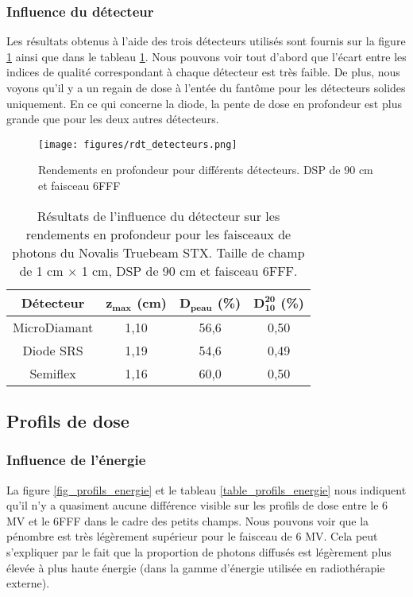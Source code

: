 \documentclass{article}
\begin{document}
\subsubsection{Influence du détecteur}

Les résultats obtenus à l'aide des trois détecteurs utilisés sont fournis sur la figure \ref*{fig_rdt_detecteurs} ainsi que dans le tableau \ref*{table_rdt_detecteurs}. Nous pouvons voir tout d'abord que l'écart entre les indices de qualité correspondant à chaque détecteur est très faible. De plus, nous voyons qu'il y a un regain de dose à l'entée du fantôme pour les détecteurs solides uniquement. En ce qui concerne la diode, la pente de dose en profondeur est plus grande que pour les deux autres détecteurs.

\begin{figure}[h]
  \centering
  \texttt{[image: figures/rdt\_detecteurs.png]}
  \caption{Rendements en profondeur pour différents détecteurs. DSP de 90 cm et faisceau 6FFF}
  \label{fig_rdt_detecteurs}
\end{figure}

\begin{table}[h]
  \centering
  \begin{tabular}{cccc}
    \toprule
    \bfseries Détecteur & $\mathbf{z_{max}}$ \textbf{(cm)} & $\mathbf{D_{peau}}$ \textbf{(\%)} & $\mathbf{D^{20}_{10}}$ \textbf{(\%)} \\
    \toprule
    MicroDiamant & 1,10 & 56,6 & 0,50 \\
    Diode SRS & 1,19 & 54,6 & 0,49 \\
    Semiflex & 1,16 & 60,0 & 0,50 \\
    \bottomrule
  \end{tabular}
  \caption{Résultats de l'influence du détecteur sur les rendements en profondeur pour les faisceaux de photons du Novalis Truebeam STX. Taille de champ de 1 cm $\times$ 1 cm, DSP de 90 cm et faisceau 6FFF.}
  \label{table_rdt_detecteurs}
\end{table}

\newpage
\subsection{Profils de dose}
\subsubsection{Influence de l'énergie}

La figure \ref*{fig_profils_energie} et le tableau \ref*{table_profils_energie} nous indiquent qu'il n'y a quasiment aucune différence visible sur les profils de dose entre le 6 MV et le 6FFF dans le cadre des petits champs. Nous pouvons voir que la pénombre est très légèrement supérieur pour le faisceau de 6 MV. Cela peut s'expliquer par le fait que la proportion de photons diffusés est légèrement plus élevée à plus haute énergie (dans la gamme d'énergie utilisée en radiothérapie externe).
\end{document}
